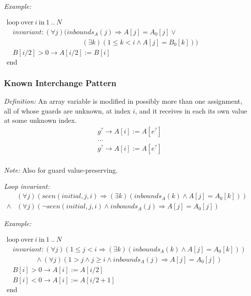 \documentclass[a4paper,10pt]{article}
\newcommand{\idx}{\ensuremath{i}\xspace}
\newcommand{\idxinitial}{\ensuremath{\mathit{initial}}\xspace}
\newcommand{\KWloop}{\ensuremath{\mathrm{loop}~}}
\newcommand{\KWend}{\ensuremath{\mathrm{end}~}}
\newcommand{\KWover}{\ensuremath{\mathrm{over}~}}
\newcommand{\KWin}{\ensuremath{~\mathrm{in}~}}
\newcommand{\impl}{\ensuremath{\Longrightarrow}}
\newcommand{\inbounds}[2]{\ensuremath{\mathit{inbounds}_{#1}(#2)}\xspace}
\newcommand{\seen}[3]{\ensuremath{\mathit{seen}{(#1,#2,#3)}}\xspace}
\newcommand{\loopinvariant}{\noindent\textit{Loop invariant:}\xspace}
\newcommand{\patterndef}{\noindent\textit{Definition:}\xspace}
\newcommand{\patternexample}{\noindent\textit{Example:}\xspace}
\newcommand{\patternnote}{\noindent\textit{Note:}\xspace}
\begin{document}
\bigskip
\patternexample

\medskip
$\begin{array}{l}
  \KWloop \KWover i \KWin 1~..~N \\
  ~~~~ \textit{invariant}: (\forall j)(\inbounds{A}{j} \impl A[j] = A_0[j] \lor \\
  ~~~~~~~~~~~~~~~~~~~~~~~~~~~~~~~~~~~~~~~~~~~~~~~~~~ (\exists k)(1 \leq k < i \land A[j] = B_0[k]))\\
  ~~~~ B[i/2] > 0 \rightarrow A[i/2] := B[i]\\
  \KWend
\end{array}$

\subsubsection*{Known Interchange Pattern}

\patterndef An array variable is modified in possibly more than one assignment,
all of whose guards are unknown, at index \idx, and it receives in each
its own value at some unknown index.
%
\begin{eqnarray*}
&g^? \rightarrow A[\idx] := A[e^?]\\
&...\\
&g^? \rightarrow A[\idx] := A[e^?]\\
\end{eqnarray*}

\patternnote Also for guard value-preserving.

\medskip
\loopinvariant
%
\begin{eqnarray*}
&(\forall j)(\seen{\idxinitial}{j}{\idx} \impl (\exists k)(\inbounds{A}{k} \land A[j] = A_0[k])) \\
\land&
(\forall j)(\neg \seen{\idxinitial}{j}{\idx} \land \inbounds{A}{j} \impl A[j] = A_0[j])
\end{eqnarray*}

\bigskip
\patternexample

\medskip
$\begin{array}{l}
  \KWloop \KWover i \KWin 1~..~N \\
  ~~~~ \textit{invariant}: (\forall j)(1 \leq j < i \impl (\exists k)(\inbounds{A}{k} \land A[j] = A_0[k]))\\
  ~~~~~~~~~~~~~~~~~~~ \land (\forall j)(1 > j \land j \geq i \land \inbounds{A}{j} \impl A[j] = A_0[j])\\
  ~~~~ B[i] > 0 \rightarrow A[i] := A[i/2]\\
  ~~~~ B[i] < 0 \rightarrow A[i] := A[i/2+1]\\
  \KWend
\end{array}$
\end{document}
